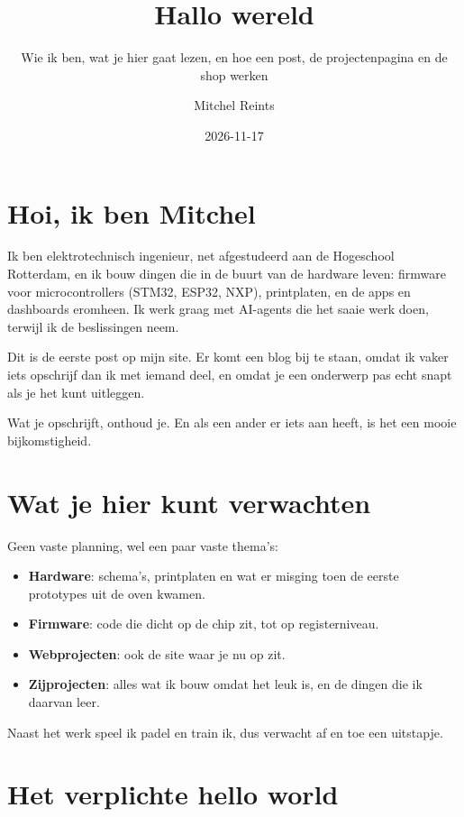 \documentclass[11pt,a4paper]{article}
\title{Hallo wereld}
\subtitle{Wie ik ben, wat je hier gaat lezen, en hoe een post, de projectenpagina en de shop werken}
\author{Mitchel Reints}
\date{2026-11-17}
\begin{document}
\maketitle

\section{Hoi, ik ben Mitchel}

Ik ben elektrotechnisch ingenieur, net afgestudeerd aan de Hogeschool Rotterdam, en ik bouw dingen die in de buurt van de hardware leven: firmware voor microcontrollers (STM32, ESP32, NXP), printplaten, en de apps en dashboards eromheen. Ik werk graag met AI-agents die het saaie werk doen, terwijl ik de beslissingen neem.

Dit is de eerste post op mijn site. Er komt een blog bij te staan, omdat ik vaker iets opschrijf dan ik met iemand deel, en omdat je een onderwerp pas echt snapt als je het kunt uitleggen.

\begin{tip}
Wat je opschrijft, onthoud je. En als een ander er iets aan heeft, is het een mooie bijkomstigheid.
\end{tip}

\section{Wat je hier kunt verwachten}

Geen vaste planning, wel een paar vaste thema's:

\begin{itemize}
  \item \textbf{Hardware}: schema's, printplaten en wat er misging toen de eerste prototypes uit de oven kwamen.
  \item \textbf{Firmware}: code die dicht op de chip zit, tot op registerniveau.
  \item \textbf{Webprojecten}: ook de site waar je nu op zit.
  \item \textbf{Zijprojecten}: alles wat ik bouw omdat het leuk is, en de dingen die ik daarvan leer.
\end{itemize}

Naast het werk speel ik padel en train ik, dus verwacht af en toe een uitstapje.

\section{Het verplichte hello world}
\end{document}
